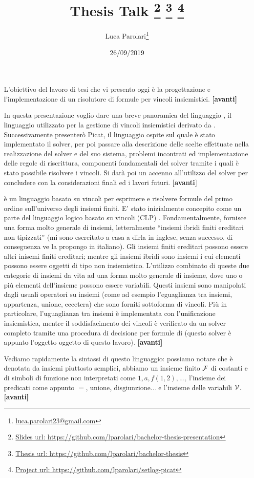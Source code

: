 \documentclass[11pt]{article}
\title{
	\textbf{Thesis Talk}
	\footnote{\href{https://github.com/lparolari/bachelor-thesis-presentation}{Slides url: https://github.com/lparolari/bachelor-thesis-presentation}}
	\footnote{\href{https://github.com/lparolari/bachelor-thesis}{Thesis url: https://github.com/lparolari/bachelor-thesis}}
	\footnote{\href{https://github.com/lparolari/setlog-picat}{Project url: https://github.com/lparolari/setlog-picat}}
}
\author{Luca Parolari\footnote{\href{mailto:luca.parolari23@gmail.com}{luca.parolari23@gmail.com}}}
\date{26/09/2019}
\newcommand*{\nextslide}{\textbf{[avanti]}}
\begin{document}
\maketitle

L'obiettivo del lavoro di tesi che vi presento oggi è la progettazione
e l'implementazione di un risolutore di formule per vincoli
insiemistici. \nextslide{}

In questa presentazione voglio dare una breve panoramica del
linguaggio \lset{}, il linguaggio utilizzato per la gestione di
vincoli insiemistici derivato da \clpset{}. Successivamente presenterò
Picat, il linguaggio ospite sul quale è stato implementato il solver,
per poi passare alla descrizione delle scelte effettuate nella
realizzazione del solver e del suo sistema, problemi incontrati ed
implementazione delle regole di riscrittura, componenti fondamentali
del solver tramite i quali è stato possibile risolvere i vincoli. Si
darà poi un accenno all'utilizzo del solver per concludere con la
considerazioni finali ed i lavori futuri. \nextslide{}

\lset{} è un linguaggio basato su vincoli per esprimere e risolvere
formule del primo ordine sull'universo degli insiemi finiti. E' stato
inizialmente concepito come un parte del linguaggio logico basato su
vincoli (CLP) \clpset{}. Fondamentalmente, \lset{} fornisce una forma
molto generale di insiemi, letteralmente ``insiemi ibridi finiti
ereditari non tipizzati'' (mi sono esercitato a casa a dirla in
inglese, senza successo, di conseguenza ve la propongo in
italiano). Gli insiemi finiti ereditari possono essere altri inisemi
finiti ereditari; mentre gli insiemi ibridi sono insiemi i cui
elementi possono essere oggetti di tipo non insiemistico. L'utilizzo
combinato di queste due categorie di insiemi da vita ad una forma
molto generale di insieme, dove uno o più elementi dell'insieme
possono essere variabili. Questi insiemi sono manipolati dagli usuali
operatori su insiemi (come ad esempio l'eguaglianza tra insiemi,
appartenza, unione, eccetera) che sono forniti sottoforma di
vincoli. Più in particolare, l'uguaglianza tra insiemi è implementata
con l'unificazione insiemistica, mentre il soddisfacimento dei vincoli
è verificato da un solver completo tramite una procedura di decisione
per formule di \lset{} (questo solver è appunto l'oggetto oggetto di
questo lavoro). \nextslide{}

Vediamo rapidamente la sintassi di questo linguaggio: possiamo notare
che è denotata da insiemi piuttosto semplici, abbiamo un insieme
finito $\mathcal{F}$ di costanti e di simboli di funzione non interpretati
come $1, a, f(1,2), ...$, l'insieme dei predicati come appunto $=$,
unione, disgiunzione... e l'insieme delle variabili
$\mathcal{V}$. \nextslide{}
\end{document}
